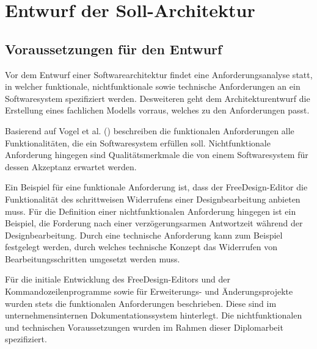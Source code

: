 \section{Entwurf der Soll-Architektur}

\subsection{Voraussetzungen für den Entwurf}
Vor dem Entwurf einer Softwarearchitektur findet eine Anforderungsanalyse statt, in welcher funktionale, nichtfunktionale sowie technische Anforderungen an ein Softwaresystem spezifiziert werden. Desweiteren geht dem Architekturentwurf die Erstellung eines fachlichen Modells vorraus, welches zu den Anforderungen passt. \autocite[vgl.][S. 58 ]{Posch2007}

Basierend auf Vogel et al. (\citeyear[vgl.][S. 113 ]{Vogel2009}) beschreiben die funktionalen Anforderungen alle Funktionalitäten, die ein Softwaresystem erfüllen soll. Nichtfunktionale Anforderung hingegen sind Qualitätsmerkmale die von einem Softwaresystem für dessen Akzeptanz erwartet werden. 

Ein Beispiel für eine funktionale Anforderung ist, dass der FreeDesign-Editor die Funktionalität des schrittweisen Widerrufens einer Designbearbeitung anbieten muss. 
Für die Definition einer nichtfunktionalen Anforderung hingegen ist ein Beispiel, die Forderung nach einer verzögerungsarmen Antwortzeit während der Designbearbeitung.
Durch eine technische Anforderung kann zum Beispiel festgelegt werden, durch welches technische Konzept das Widerrufen von Bearbeitungsschritten umgesetzt werden muss. 

Für die initiale Entwicklung des FreeDesign-Editors und der Kommandozeilenprogramme sowie für Erweiterungs- und Änderungsprojekte wurden stets die funktionalen Anforderungen beschrieben. Diese sind im unternehmensinternen Dokumentationssystem hinterlegt. 
Die nichtfunktionalen und technischen Voraussetzungen wurden im Rahmen dieser Diplomarbeit spezifiziert. 

